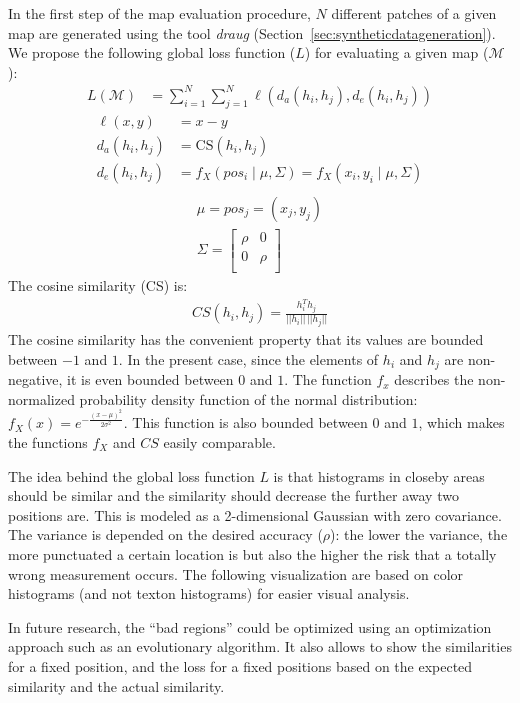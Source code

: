 \documentclass{report}
\begin{document}
In the first step of the map evaluation procedure, $N$ different
patches of a given map are generated using the tool \emph{draug}
(Section~\ref{sec:syntheticdatageneration}). We propose the following
global loss function ($L$) for evaluating a given map ($\mathcal{M}$):
\begin{align}
  L(\mathcal{M}) &= \sum_{i = 1}^{N} \sum_{j = 1}^{N} \ell(d_a(h_i, h_j), d_e(h_i, h_j))
\end{align}
\begin{align}
  \ell(x, y) &= x - y\\
  d_a(h_i, h_j) &= \text{CS}(h_i, h_j)\\
  d_e(h_i, h_j) &= f_X(pos_i \mid \mu, \Sigma) = f_X(x_i, y_i \mid \mu, \Sigma)\\
\end{align}
\begin{align}
\mu = pos_j = (x_j, y_j)\\
\Sigma =
  \begin{bmatrix}
    \rho & 0\\
    0 & \rho\\
  \end{bmatrix}
\end{align}
The cosine similarity (CS) is:
\begin{align}
CS(h_i, h_j) = \frac{h_i^Th_j}{||h_i||\,||h_j||}
\end{align}
The cosine similarity has the convenient property that its values are
bounded between $-1$ and $1$. In the present case, since the elements
of $h_i$ and $h_j$ are non-negative, it is even bounded between $0$
and $1$. The function $f_x$ describes the non-normalized probability
density function of the normal distribution:
$f_X(x) = e^{- \frac{(x - \mu)^2}{2 \sigma ^ 2}}$. This function is
also bounded between $0$ and $1$, which makes the functions $f_X$ and
$CS$ easily comparable.

The idea behind the global loss function $L$ is that histograms in
closeby areas should be similar and the similarity should decrease the
further away two positions are. This is modeled as a 2-dimensional
Gaussian with zero covariance. The variance is depended on the desired
accuracy ($\rho$): the lower the variance, the more punctuated a
certain location is but also the higher the risk that a totally wrong
measurement occurs. The following visualization are based on color
histograms (and not texton histograms) for easier visual analysis.

In future research, the ``bad regions'' could be optimized using an
optimization approach such as an evolutionary algorithm. It also
allows to show the similarities for a fixed position, and the loss for
a fixed positions based on the expected similarity and the actual
similarity.
\end{document}
